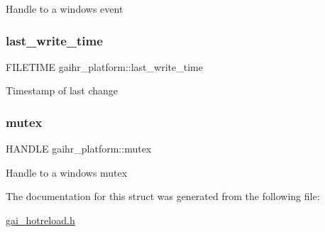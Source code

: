 Handle to a windows event \mbox{\label{structgaihr__platform_a6be2e4d6d98523e09c04a19b20d04cd1}} 
\subsubsection{\texorpdfstring{last\+\_\+write\+\_\+time}{last\_write\_time}}
{\footnotesize\ttfamily F\+I\+L\+E\+T\+I\+ME gaihr\+\_\+platform\+::last\+\_\+write\+\_\+time}

Timestamp of last change \mbox{\label{structgaihr__platform_a4502c637972f49cbb803c93975fe45f4}} 
\subsubsection{\texorpdfstring{mutex}{mutex}}
{\footnotesize\ttfamily H\+A\+N\+D\+LE gaihr\+\_\+platform\+::mutex}

Handle to a windows mutex 

The documentation for this struct was generated from the following file\+:\begin{DoxyCompactItemize}
\item 
\hyperlink{gai__hotreload_8h}{gai\+\_\+hotreload.\+h}\end{DoxyCompactItemize}
